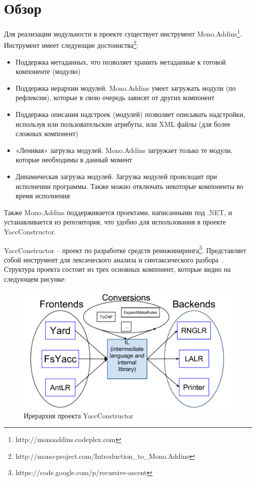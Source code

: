 \section{Обзор}
Для реализации модульности в проекте существует инструмент Mono.Addins\footnote{http://monoaddins.codeplex.com}.
Инструмент имеет следующие достоинства\footnote{http://mono-project.com/Introduction\_to\_Mono.Addins}:
\begin{itemize}
\item Поддержка метаданных, что позволяет хранить метаданные к готовой компоненте (модулю)
\item Поддержка иерархии модулей. Mono.Addins умеет загружать модули (по рефлексии), которые в свою очередь зависят от других компонент
\item Поддержка описания надстроек (модулей) позволяет описывать надстройки, используя или пользовательские атрибуты, или XML файлы (для более сложных компонент)
\item «Ленивая» загрузка модулей. Mono.Addins загружает только те модули, которые необходимы в данный момент
\item Динамическая загрузка модулей. Загрузка модулей происходит при исполнении программы. Также можно отключать некоторые компоненты во время исполнения
\end{itemize}

Также Mono.Addins поддерживается проектами, написанными под .NET, и устанавливается из репозитория, что удобно для использования в проекте YaccConstructor.

YaccConstructor – проект по разработке средств реинжиниринга\footnote{https://code.google.com/p/recursive-ascent}. Представляет собой инструмент для лексического анализа и синтаксического разбора~\cite{YC_base}.  Структура проекта состоит из трех основных компонент, которые видно на следующем рисунке:

\begin{figure}[h!]
\begin{center}
\includegraphics[width=\linewidth]{Orlov/structyc}
\caption{Ирерархия проекта YaccConstructor}
\label{fig:structyc} 
\end{center}
\end{figure}

